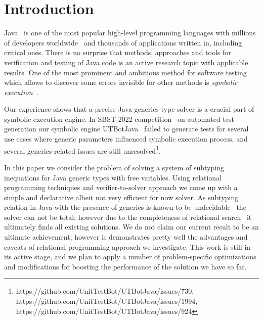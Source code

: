 \section{Introduction}
\label{sec:intro}

Java~\cite{java} is one of the most popular high-level programming languages with millions of developers worldwide~\cite{tiobe} and
thousands of applications written in, including critical ones. There is no surprise that methods, approaches and tools for verification and testing
of Java code is an active research topic with applicable results. One of the most prominent and ambitious method for software testing  which
allows to discover some errors invisible for other methods is \emph{symbolic execution}~\cite{Symbolic}.

Our experience shows that a precise Java generics type solver is a crucial part of symbolic execution engine. In SBST-2022 competition~\cite{SBCT} on
automated test generation our symbolic engine UTBotJava~\cite{UTBot} failed to generate tests for several use cases where generic parameters influenced
symbolic execution process, and several generics-related issues are still unresolved\footnote{https://github.com/UnitTestBot/UTBotJava/issues/730, https://github.com/UnitTestBot/UTBotJava/issues/1994, https://github.com/UnitTestBot/UTBotJava/issues/924}.

In this paper we consider the problem of solving a system of subtyping inequations for Java generic types with free variables. Using relational programming techniques and
verifier-to-solver approach we come up with a simple and declarative albeit not very efficient for now solver. As subtyping relation in Java with the presence of
generics is known to be undecidable~\cite{JGTC} the solver can not be total; however due to the completeness of relational search~\cite{certified} it ultimately
finds all existing solutions. We do not claim our current result to be an ultimate achievement; 
however is demonstrates pretty well the advantages and caveats of relational programming approach we investigate. This work is still in its active stage, and we
plan to apply a number of problem-specific optimizations and modifications for boosting the performance of the solution we have so far.


